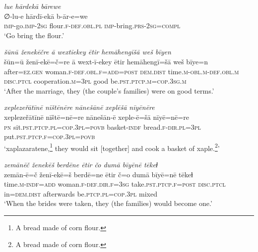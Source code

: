 \ea \label{RE.19}
\textit{lue hārdekā bārewe} \\ 
\gll ∅-lu-e hārdī-ekā b-ār-e=we \\ 
 \textsc{imp-}go.\textsc{imp-}\textsc{2sg} flour\textsc{.f}\textsc{-def}\textsc{.obl}\textsc{.pl} \textsc{imp-}bring\textsc{.prs}-\textsc{2sg}\textsc{=compl} \\ 
\glt `Go bring the flour.'
\z 
 
\ea \label{RE.22}
\textit{šūnū ženekēčre ā wextīekey ētir hemāhengīšā weš bīyen} \\ 
\gll šūn=ū ženī-ekē=č=re ā wext-ī-ekey ētir hemāhengī=šā weš bīye=n \\ 
 after\textsc{=ez.gen} woman\textsc{.f}\textsc{-def}\textsc{.obl}\textsc{.f}\textsc{=add}\textsc{=\textsc{post}} \textsc{dem.dist} time\textsc{.m}\textsc{-obl}\textsc{.m}\textsc{-def}\textsc{.obl}\textsc{.m} \textsc{disc.ptcl} cooperation\textsc{.m}\textsc{=3pl} good be\textsc{.pst}\textsc{.ptcp}\textsc{.m}\textsc{=cop}\textsc{.3sg}\textsc{.m} \\ 
\glt `After the marriage, they (the couple's families) were on good terms.'
\z 
 
\ea \label{RE.24}
\textit{xeplezeřātīnē nīštēnēre nānešānē xeplēšā nīyēnēre} \\ 
\gll xeplezeřātīnē nīštē=nē=re nānešān-ē xeple-ē=šā nīyē=nē=re \\ 
 \textsc{pn} sit\textsc{.pst}\textsc{.ptcp}\textsc{.pl}\textsc{=cop}\textsc{.3pl}\textsc{=\textsc{povb}} basket\textsc{-indf} bread\textsc{.f}\textsc{-dir}\textsc{.pl}\textsc{=3pl} put\textsc{.pst}\textsc{.ptcp}\textsc{.f}\textsc{=cop}\textsc{.3pl}\textsc{=\textsc{povb}} \\ 
\glt `xaplazaratene,\footnote{A bread made of corn flour.} they would sit [together] and cook a basket of xaple.\footnote{A bread made of corn flour.}'
\z 
 
\ea \label{RE.26}
\textit{zemānēč ženekēš berdēne ētir čo dumā bīyēnē tēkeɫ} \\ 
\gll zemān-ē=č ženī-ekē=š berdē=ne ētir č=o dumā bīyē=nē tēkeɫ \\ 
 time\textsc{.m}\textsc{-indf}\textsc{=add} woman\textsc{.f}\textsc{-def}\textsc{.dir}\textsc{.f}\textsc{=3sg} take\textsc{.pst}\textsc{.ptcp}\textsc{.f}\textsc{=\textsc{post}} \textsc{disc.ptcl} in=\textsc{dem.dist} afterwards be\textsc{.ptcp}\textsc{.pl}\textsc{=cop}\textsc{.3pl} mixed \\ 
\glt `When the brides were taken, they (the families) would become one.'
\z 
 
